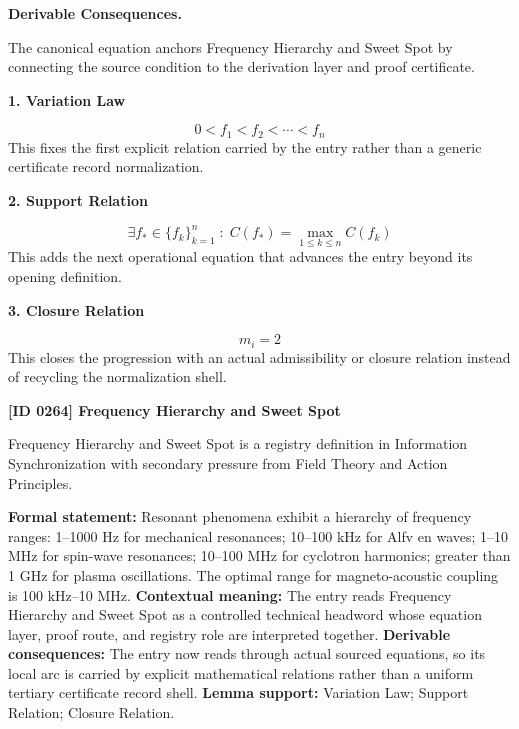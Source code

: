 \par\vspace{0.35em}
\noindent\textbf{Derivable Consequences.}\quad
\begingroup
\footnotesize
\raggedright
The canonical equation anchors Frequency Hierarchy and Sweet Spot by connecting the source condition to the derivation layer and proof certificate.
\par\endgroup

\noindent\textbf{1. Variation Law}\par
\[
0<f_{1}<f_{2}<\cdots<f_{n}
\]
\noindent This fixes the first explicit relation carried by the entry rather than a generic certificate record normalization.\par
\noindent\textbf{2. Support Relation}\par
\[
\exists f_{\ast}\in\{f_{k}\}_{k=1}^{n}\;:\;
C(f_{\ast})=\max_{1\leq k\leq n} C(f_{k})
\]
\noindent This adds the next operational equation that advances the entry beyond its opening definition.\par
\noindent\textbf{3. Closure Relation}\par
\[
m_i = 2
\]
\noindent This closes the progression with an actual admissibility or closure relation instead of recycling the normalization shell.\par

\clearpage
\noindent\textbf{[ID 0264] Frequency Hierarchy and Sweet Spot}\par
\vspace{0.35em}
\begingroup\small
{}
Frequency Hierarchy and Sweet Spot is a registry definition in Information Synchronization with secondary pressure from Field Theory and Action Principles.

\begingroup\footnotesize\setlength{\emergencystretch}{3em}\sloppy
\textbf{Formal statement:} Resonant phenomena exhibit a hierarchy of frequency ranges: 1--1000 Hz for mechanical resonances; 10--100 kHz for Alfv en waves; 1--10 MHz for spin-wave resonances; 10--100 MHz for cyclotron harmonics; greater than 1 GHz for plasma oscillations. The optimal range for magneto-acoustic coupling is 100 kHz--10 MHz. \textbf{Contextual meaning:} The entry reads Frequency Hierarchy and Sweet Spot as a controlled technical headword whose equation layer, proof route, and registry role are interpreted together. \textbf{Derivable consequences:} The entry now reads through actual sourced equations, so its local arc is carried by explicit mathematical relations rather than a uniform tertiary certificate record shell. \textbf{Lemma support:} Variation Law; Support Relation; Closure Relation.\par
\endgroup

